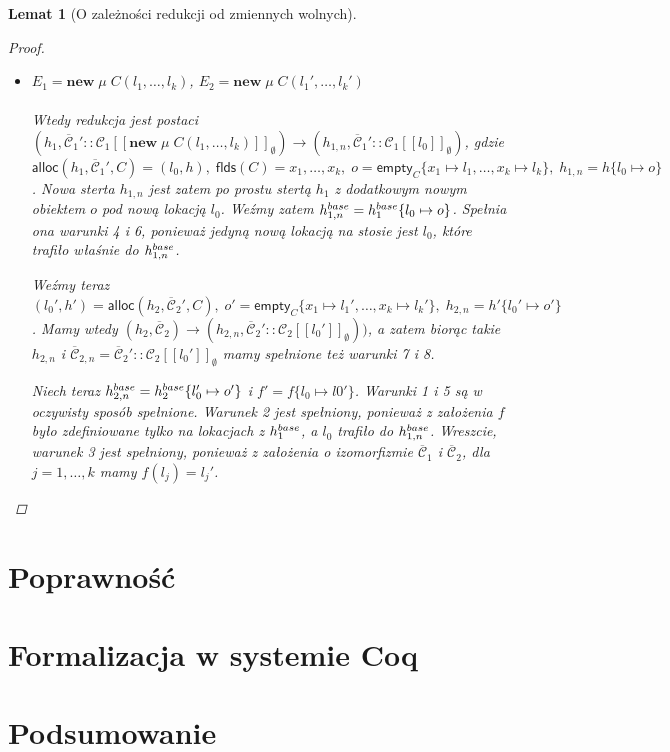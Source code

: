 \documentclass[]{pracamgr}
\renewcommand \| {\hspace{0.75em} | \hspace{0.75em} }
\renewcommand \[ {[\![}
\renewcommand \] {]\!]}
\newtheorem{lemma}{Lemat}
\theoremstyle{definition}
\newcommand{\mmod}{\mu\xspace}
\newcommand{\jnew}{\mathbf{new}\xspace}
\newcommand{\newin}[3]{\jnew\; #1\; #2(#3)\xspace}
\newcommand{\ctxt}{\mathcal{C}\xspace}
\newcommand{\ctxts}{\overline{\ctxt}}
\newcommand{\alloc}{\mathsf{alloc}\xspace}
\newcommand{\fields}{\mathsf{flds}\xspace}
\newcommand{\emptyclass}[1]{\mathsf{empty}_{#1}\xspace}
\begin{document}
\begin{lemma}[O zależności redukcji od zmiennych wolnych]{\ }
\begin{proof}
\begin{itemize}
 \item $E_1 = \newin{\mmod}{C}{l_1,\ldots,l_k}$, \;\; $E_2 = \newin{\mmod}{C}{l_1',\ldots,l_k'}$ \\ \\
 Wtedy redukcja jest postaci
 $(h_1,  \ctxts_1':: \ctxt_1\[ \newin{\mmod}{C}{l_1,\ldots,l_k}\] _\emptyset) \rightarrow (h_{1, n}, \ctxts_1' :: \ctxt_1\[ l_0\] _\emptyset)$,
gdzie
$ \alloc(h_1, \ctxts_1', C)=(l_0, h),\; \fields(C) = x_1, \dots, x_k,\;
o=\emptyclass{C}\{x_1 \mapsto  l_1,\ldots,x_k \mapsto  l_k\}, \; h_{1,n} = h\{l_0 \mapsto  o\}$.
Nowa sterta $h_{1,n}$ jest zatem po prostu stertą $h_1$ z dodatkowym nowym obiektem $o$ pod nową lokacją $l_0$.
Weźmy zatem $h^{base}_{1,n} = h^{base}_1\{l_0 \mapsto o\}$.
Spełnia ona warunki 4 i 6, ponieważ jedyną nową lokacją na stosie jest $l_0$, które trafiło właśnie do $h^{base}_{1,n}$.

Weźmy teraz $(l_0', h') = \alloc(h_2, \ctxts_2', C),\;
o'=\emptyclass{C}\{x_1 \mapsto  l_1',\ldots,x_k \mapsto  l_k'\}, \; h_{2,n} = h'\{l_0' \mapsto  o'\}$.
Mamy wtedy 
$(h_2, \ctxts_2) \rightarrow (h_{2, n}, \ctxts_2' :: \ctxt_2\[ l_0'\] _\emptyset))$, a zatem biorąc takie $h_{2, n}$
i $\ctxts_{2,n} = \ctxts_2' :: \ctxt_2\[ l_0'\] _\emptyset$ mamy spełnione też warunki 7 i 8.

Niech teraz $h^{base}_{2,n} = h^{base}_2\{l_0' \mapsto o'\}$ i $f' = f\{l_0 \mapsto l0'\}$.
Warunki 1 i 5 są w oczywisty sposób spełnione.
Warunek 2 jest spełniony, ponieważ z założenia $f$ było zdefiniowane tylko na lokacjach z $h^{base}_1$, a $l_0$ trafiło do $h^{base}_{1,n}$.
Wreszcie, warunek 3 jest spełniony, ponieważ z założenia o izomorfizmie $\ctxts_1$ i $\ctxts_2$,
dla $j = 1, \ldots, k$ mamy $f(l_j) = l_j'$.
\end{itemize}
\end{proof}




\end{lemma}


\chapter{Poprawność}

\chapter{Formalizacja w systemie Coq}

\chapter{Podsumowanie}
\end{document}
